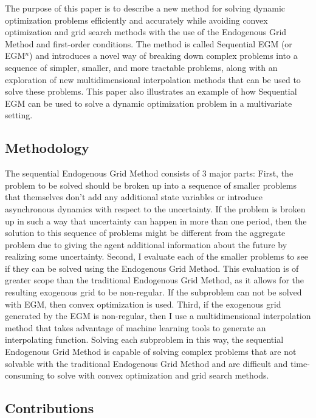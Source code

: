 \documentclass[\econtexRoot/SequentialEGM]{subfiles}
\begin{document}
The purpose of this paper is to describe a new method for solving dynamic optimization problems efficiently and accurately while avoiding convex optimization and grid search methods with the use of the Endogenous Grid Method and first-order conditions. The method is called Sequential EGM (or EGM$^n$) and introduces a novel way of breaking down complex problems into a sequence of simpler, smaller, and more tractable problems, along with an exploration of new multidimensional interpolation methods that can be used to solve these problems. This paper also illustrates an example of how Sequential EGM can be used to solve a dynamic optimization problem in a multivariate setting.

\subsection{Methodology} %

The sequential Endogenous Grid Method consists of 3 major parts: First, the problem to be solved should be broken up into a sequence of smaller problems that themselves don't add any additional state variables or introduce asynchronous dynamics with respect to the uncertainty. If the problem is broken up in such a way that uncertainty can happen in more than one period, then the solution to this sequence of problems might be different from the aggregate problem due to giving the agent additional information about the future by realizing some uncertainty. Second, I evaluate each of the smaller problems to see if they can be solved using the Endogenous Grid Method. This evaluation is of greater scope than the traditional Endogenous Grid Method, as it allows for the resulting exogenous grid to be non-regular. If the subproblem can not be solved with EGM, then convex optimization is used. Third, if the exogenous grid generated by the EGM is non-regular, then I use a multidimensional interpolation method that takes advantage of machine learning tools to generate an interpolating function. Solving each subproblem in this way, the sequential Endogenous Grid Method is capable of solving complex problems that are not solvable with the traditional Endogenous Grid Method and are difficult and time-consuming to solve with convex optimization and grid search methods.

\subsection{Contributions} %
\end{document}
